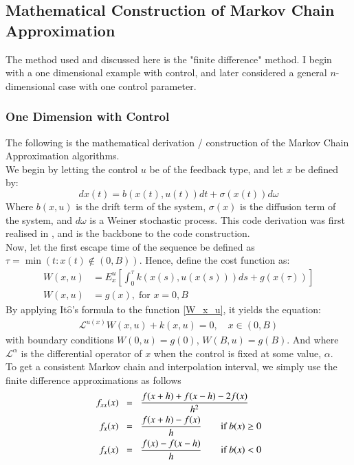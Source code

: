 \documentclass[11pt,draftd]{article}
\newcommand{\Lagr}{\mathcal{L}}
\begin{document}
\subsection{Mathematical Construction of Markov Chain Approximation}
The method used and discussed here is the "finite difference" method. I begin with a one dimensional example with control, and later considered a general $ n $-dimensional case with one control parameter.

\subsubsection{One Dimension with Control}
The following is the mathematical derivation / construction of the Markov Chain Approximation algorithms. \\

We begin by letting the control $ u $ be of the feedback type, and let $ x $ be defined by:
\begin{equation}\label{Eq_PduDefinition1D}
	dx(t) = b(x(t),u(t)) dt + \sigma(x(t))d\omega
\end{equation}
Where $ b(x,u) $ is the drift term of the system, $ \sigma(x) $ is the diffusion term of the system, and $ d\omega $ is a Weiner stochastic process. This code derivation was first realised in \cite{kushner}, and is the backbone to the code construction. \\

Now, let the first escape time of the sequence be defined as $\tau = \min\left(t : x(t)  \notin \left(0, B\right)  \right) $. Hence, define the cost function as:
\begin{align}\label{W_x_u}
	W(x,u) &= E_{x}^{u}\left[\int_{0}^{\tau}k(x(s),u(x(s)))ds + g(x(\tau))\right] \\
	W(x,u) &= g(x),\; \text{for } x=0,B
\end{align}
By applying It$\hat{\text{o}}$'s formula to the function \eqref{W_x_u}, it yields the equation:
\begin{align}\label{Eq_Lagrange1D}
	\Lagr^{u(x)}W(x,u) + k(x,u) = 0, \quad x\in(0,B)
\end{align}
with boundary conditions $ W(0,u) = g(0) $, $ W(B,u) = g(B) $. And where $ \Lagr^{\alpha} $ is the differential operator of $ x $ when the control is fixed at some value, $ \alpha $. \\

To get a consistent Markov chain and interpolation interval, we simply use the finite difference approximations as follows
\begin{align}
	f_{xx}(x)\;\;&=\;\;\frac{f(x+h) + f(x-h) - 2f(x)}{h^{2}} \\
	f_{x}(x) \;\;&=\;\;\frac{f(x+h) - f(x)}{h} \qquad \text{if $ b(x) \ge 0 $} \\
	f_{x}(x) \;\;&=\;\;\frac{f(x) - f(x - h)}{h} \qquad \text{if $ b(x) < 0 $}
\end{align}
\end{document}
